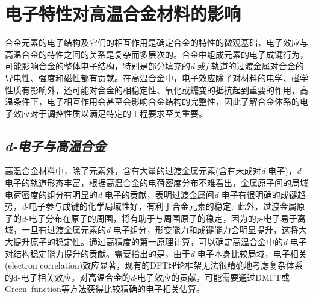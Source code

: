 \section{电子特性对高温合金材料的影响}
合金元素的电子结构及它们的相互作用是确定合金的特性的微观基础，电子效应与高温合金的特性之间的关系是复杂而多层次的。合金中组成元素的电子成键行为，可能影响合金的整体电子结构，特别是部分填充的{\textit d}-或{\textit f}-轨道的过渡金属对合金的导电性、强度和磁性都有贡献。在高温合金中，电子效应除了对材料的电学、磁学性质有影响外，还可能对合金的相稳定性、氧化或蠕变的抵抗起到重要的作用，高温条件下，电子相互作用会甚至会影响合金结构的完整性，因此了解合金体系的电子效应对于调控性质以满足特定的工程要求至关重要。 

\subsection{\it{d}-电子与高温合金}
高温合金材料中，除了元素外，含有大量的过渡金属元素(含有未成对\textit{d}-电子)，\textit{d}-电子的轨道形态丰富，根据高温合金的电荷密度分布不难看出，金属原子间的局域电荷密度的组分有明显的\textit{d}-电子的贡献，表明过渡金属间\textit{d}-电子有很明确的成键趋势，\textit{d}-电子参与成键的化学局域性好，有利于合金元素的稳定;~此外，过渡金属原子的\textit{d}-电子分布在原子的周围，将有助于与周围原子的稳定，因为的\textit{p}-电子易于离域，一旦有过渡金属元素的\textit{d}-电子组分，形变能力和成键能力会明显提升，这将大大提升原子的稳定性。通过高精度的第一原理计算，可以确定高温合金中的\textit{d}-电子对结构稳定能力提升的贡献。需要指出的是，由于\textit{d}-电子本身比较局域，电子相关(\textrm{electron correlation})效应显著，现有的\textrm{DFT}理论框架无法很精确地考虑复杂体系的\textrm{d}-电子相关效应。对高温合金的\textit{d}-电子效应的贡献，可能需要通过\textrm{DMFT}或\textrm{Green~function}等方法获得比较精确的电子相关估算。

